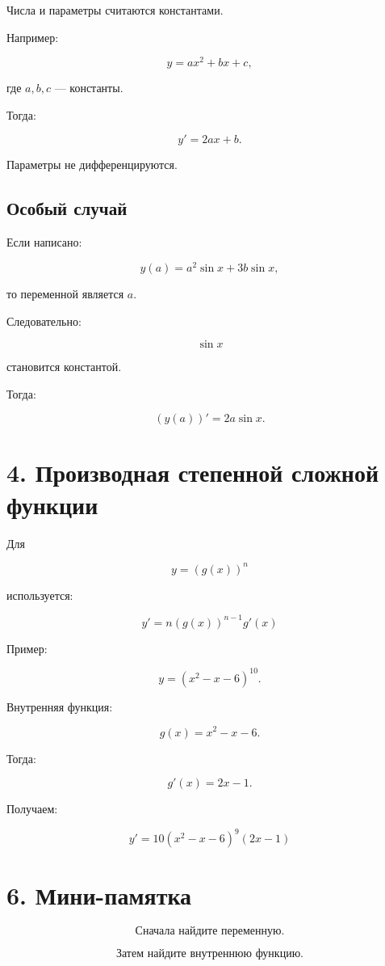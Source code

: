 \documentclass[a4paper,12pt]{article}
\begin{document}
Числа и параметры считаются константами.

Например:

\[
y=a x^2+b x+c,
\]

где $a,b,c$ --- константы.

Тогда:

\[
y'=2ax+b.
\]

Параметры не дифференцируются.

\subsection*{Особый случай}

Если написано:

\[
y(a)=a^2\sin x+3b\sin x,
\]

то переменной является $a$.

Следовательно:

\[
\sin x
\]

становится константой.

Тогда:

\[
(y(a))'
=
2a\sin x.
\]

\section*{4. Производная степенной сложной функции}

Для

\[
y=(g(x))^n
\]

используется:

\[
\boxed{
y'=n(g(x))^{n-1}g'(x)
}
\]

Пример:

\[
y=(x^2-x-6)^{10}.
\]

Внутренняя функция:

\[
g(x)=x^2-x-6.
\]

Тогда:

\[
g'(x)=2x-1.
\]

Получаем:

\[
\boxed{
y'=10(x^2-x-6)^9(2x-1)
}
\]

\clearpage



\section*{6. Мини-памятка}

\[
\boxed{
\text{Сначала найдите переменную.}
}
\]

\[
\boxed{
\text{Затем найдите внутреннюю функцию.}
}
\]
\end{document}
